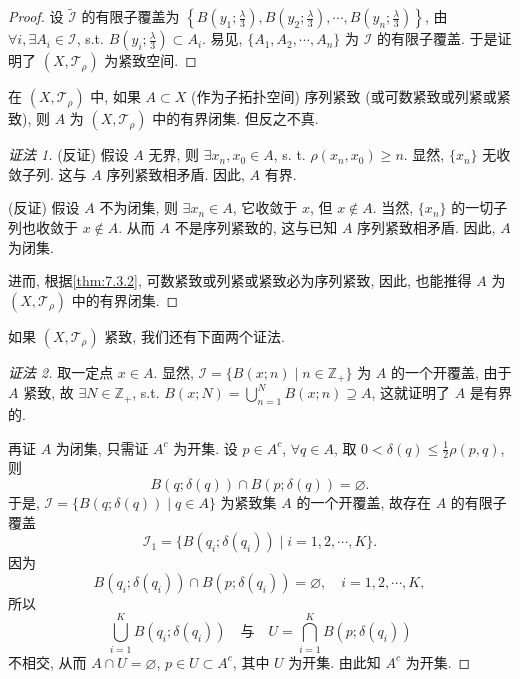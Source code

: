 \begin{proof}
设 $\widetilde{\mathcal{I}}$ 的有限子覆盖为 $\left\{B\left(y_{1}; \frac{\lambda}{3}\right), B\left(y_{2}; \frac{\lambda}{3}\right), \cdots, B\left(y_{n}; \frac{\lambda}{3}\right)\right\}$, 由 $\forall i, \exists A_{i} \in \mathcal{I}$, s.t. $B\left(y_{i}; \frac{\lambda}{3}\right) \subset A_{i}$. 易见, $\{A_{1}, A_{2}, \cdots, A_{n}\}$ 为 $\mathcal{I}$ 的有限子覆盖. 于是证明了 $(X, \mathcal{T}_{\rho})$ 为紧致空间.
\end{proof}

\begin{theorem}\label{thm:7.3.3}
在 $(X, \mathcal{T}_{\rho})$ 中, 如果 $A \subset X$ (作为子拓扑空间) 序列紧致 (或可数紧致或列紧或紧致), 则 $A$ 为 $(X, \mathcal{T}_{\rho})$ 中的有界闭集. 但反之不真.
\end{theorem}

\begin{proof}[证法 1]
(反证) 假设 $A$ 无界, 则 $\exists x_{n}, x_{0} \in A$, s. t. $\rho(x_{n}, x_{0}) \geqslant n$. 显然, $\{x_{n}\}$ 无收敛子列. 这与 $A$ 序列紧致相矛盾. 因此, $A$ 有界.

(反证) 假设 $A$ 不为闭集, 则 $\exists x_{n} \in A$, 它收敛于 $x$, 但 $x \notin A$. 当然, $\{x_{n}\}$ 的一切子列也收敛于 $x \notin A$. 从而 $A$ 不是序列紧致的, 这与已知 $A$ 序列紧致相矛盾. 因此, $A$ 为闭集.

进而, 根据\cref{thm:7.3.2}, 可数紧致或列紧或紧致必为序列紧致, 因此, 也能推得 $A$ 为 $(X, \mathcal{T}_{\rho})$ 中的有界闭集.
\end{proof}

如果 $(X, \mathcal{T}_{\rho})$ 紧致, 我们还有下面两个证法.

\begin{proof}[证法 2]
取一定点 $x \in A$. 显然, $\mathcal{I} = \{B(x; n) \mid n \in \mathbb{Z}_{+}\}$ 为 $A$ 的一个开覆盖, 由于 $A$ 紧致, 故 $\exists N \in \mathbb{Z}_{+}$, s.t. $B(x; N) = \bigcup\limits_{n=1}^{N} B(x; n) \supseteq A$, 这就证明了 $A$ 是有界的.

再证 $A$ 为闭集, 只需证 $A^{c}$ 为开集. 设 $p \in A^{c}$, $\forall q \in A$, 取 $0 < \delta(q) \leqslant \frac{1}{2}\rho(p, q)$, 则
\[
  B(q; \delta(q)) \cap B(p; \delta(q)) = \varnothing.
\]
于是, $\mathcal{I} = \{B(q; \delta(q)) \mid q \in A\}$ 为紧致集 $A$ 的一个开覆盖, 故存在 $A$ 的有限子覆盖
\[
  \mathcal{I}_{1} = \{B(q_{i}; \delta(q_{i})) \mid i = 1, 2, \cdots, K\}.
\]
因为
\[
  B(q_{i}; \delta(q_{i})) \cap B(p; \delta(q_{i})) = \varnothing, \quad i = 1, 2, \cdots, K,
\]
所以
\[
  \bigcup_{i=1}^{K} B(q_{i}; \delta(q_{i})) \quad \text{与} \quad U = \bigcap_{i=1}^{K} B(p; \delta(q_{i}))
\]
不相交, 从而 $A \cap U = \varnothing$, $p \in U \subset A^{c}$, 其中 $U$ 为开集. 由此知 $A^{c}$ 为开集.
\end{proof}

